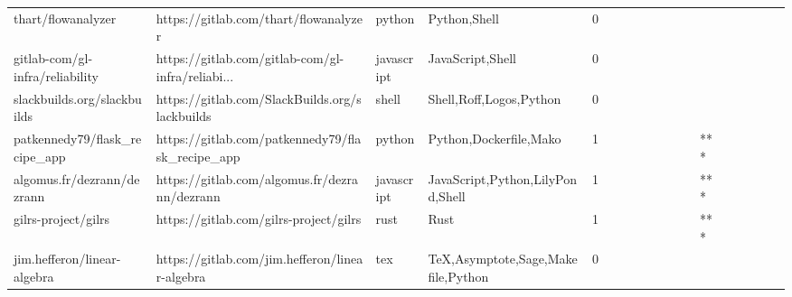 \begin{tabular}{llllrlllllllllllll}
thart/flowanalyzer                                 &              https://gitlab.com/thart/flowanalyzer &            python &                                       Python,Shell &       0 &         &        &           &                &                 &        &           &           &          &          &       &              &          \\
gitlab-com/gl-infra/reliability                    &  https://gitlab.com/gitlab-com/gl-infra/reliabi... &        javascript &                                   JavaScript,Shell &       0 &         &        &           &                &                 &        &           &           &          &          &       &              &          \\
slackbuilds.org/slackbuilds                        &     https://gitlab.com/SlackBuilds.org/slackbuilds &             shell &                            Shell,Roff,Logos,Python &       0 &         &        &           &                &                 &        &           &           &          &          &       &              &          \\
patkennedy79/flask\_recipe\_app                      &   https://gitlab.com/patkennedy79/flask\_recipe\_app &            python &                             Python,Dockerfile,Mako &       1 &         &        &           &                &                 &        &           &       *** &          &          &       &              &          \\
algomus.fr/dezrann/dezrann                         &      https://gitlab.com/algomus.fr/dezrann/dezrann &        javascript &                   JavaScript,Python,LilyPond,Shell &       1 &         &        &           &                &                 &        &           &       *** &          &          &       &              &          \\
gilrs-project/gilrs                                &             https://gitlab.com/gilrs-project/gilrs &              rust &                                               Rust &       1 &         &        &           &                &                 &        &           &       *** &          &          &       &              &          \\
jim.hefferon/linear-algebra                        &     https://gitlab.com/jim.hefferon/linear-algebra &               tex &                 TeX,Asymptote,Sage,Makefile,Python &       0 &         &        &           &                &                 &        &           &           &          &          &       &              &          \\

\end{tabular}
